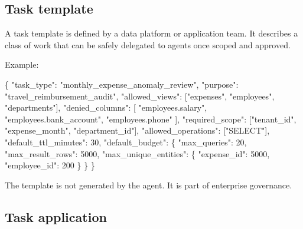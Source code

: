 \documentclass[
]{article}
\newenvironment{Shaded}{}{}
\newcommand{\DataTypeTok}[1]{\textcolor[rgb]{0.56,0.13,0.00}{#1}}
\newcommand{\DecValTok}[1]{\textcolor[rgb]{0.25,0.63,0.44}{#1}}
\newcommand{\FunctionTok}[1]{\textcolor[rgb]{0.02,0.16,0.49}{#1}}
\newcommand{\OtherTok}[1]{\textcolor[rgb]{0.00,0.44,0.13}{#1}}
\newcommand{\StringTok}[1]{\textcolor[rgb]{0.25,0.44,0.63}{#1}}
\begin{document}
\hypertarget{task-template}{%
\subsection{Task template}\label{task-template}}

A task template is defined by a data platform or application team. It
describes a class of work that can be safely delegated to agents once
scoped and approved.

Example:

\begin{Shaded}
\begin{Highlighting}[]
\FunctionTok{\{}
  \DataTypeTok{"task\_type"}\FunctionTok{:} \StringTok{"monthly\_expense\_anomaly\_review"}\FunctionTok{,}
  \DataTypeTok{"purpose"}\FunctionTok{:} \StringTok{"travel\_reimbursement\_audit"}\FunctionTok{,}
  \DataTypeTok{"allowed\_views"}\FunctionTok{:} \OtherTok{[}\StringTok{"expenses"}\OtherTok{,} \StringTok{"employees"}\OtherTok{,} \StringTok{"departments"}\OtherTok{]}\FunctionTok{,}
  \DataTypeTok{"denied\_columns"}\FunctionTok{:} \OtherTok{[}
    \StringTok{"employees.salary"}\OtherTok{,}
    \StringTok{"employees.bank\_account"}\OtherTok{,}
    \StringTok{"employees.phone"}
  \OtherTok{]}\FunctionTok{,}
  \DataTypeTok{"required\_scope"}\FunctionTok{:} \OtherTok{[}\StringTok{"tenant\_id"}\OtherTok{,} \StringTok{"expense\_month"}\OtherTok{,} \StringTok{"department\_id"}\OtherTok{]}\FunctionTok{,}
  \DataTypeTok{"allowed\_operations"}\FunctionTok{:} \OtherTok{[}\StringTok{"SELECT"}\OtherTok{]}\FunctionTok{,}
  \DataTypeTok{"default\_ttl\_minutes"}\FunctionTok{:} \DecValTok{30}\FunctionTok{,}
  \DataTypeTok{"default\_budget"}\FunctionTok{:} \FunctionTok{\{}
    \DataTypeTok{"max\_queries"}\FunctionTok{:} \DecValTok{20}\FunctionTok{,}
    \DataTypeTok{"max\_result\_rows"}\FunctionTok{:} \DecValTok{5000}\FunctionTok{,}
    \DataTypeTok{"max\_unique\_entities"}\FunctionTok{:} \FunctionTok{\{}
      \DataTypeTok{"expense\_id"}\FunctionTok{:} \DecValTok{5000}\FunctionTok{,}
      \DataTypeTok{"employee\_id"}\FunctionTok{:} \DecValTok{200}
    \FunctionTok{\}}
  \FunctionTok{\}}
\FunctionTok{\}}
\end{Highlighting}
\end{Shaded}

The template is not generated by the agent. It is part of enterprise
governance.

\hypertarget{task-application}{%
\subsection{Task application}\label{task-application}}
\end{document}
